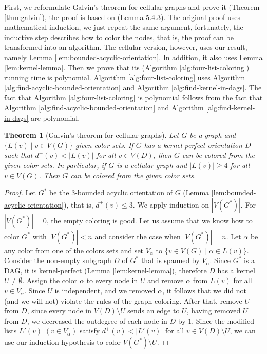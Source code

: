 \documentclass[letterpaper, 10 pt, conference]{ieeeconf}  %
\newtheorem{thm}{Theorem}
\begin{document}
First, we reformulate Galvin's theorem for cellular graphs and prove it (Theorem \ref{thm:galvin}), the proof is based on \cite{citeulike:395714} (Lemma 5.4.3). The original proof uses mathematical induction, we just repeat the same argument, fortunately, the inductive step describes how to color the nodes, that is, the proof can be transformed into an algorithm. The cellular version, however, uses our result, namely Lemma \ref{lem:bounded-acyclic-orientation}. In addition, it also uses Lemma \ref{lem:kernel-lemma}. Then we prove that its (Algorithm \ref{alg:four-list-coloring}) running time is polynomial. Algorithm \ref{alg:four-list-coloring} uses Algorithm \ref{alg:find-acyclic-bounded-orientation} and Algorithm \ref{alg:find-kernel-in-dags}. The fact that Algorithm \ref{alg:four-list-coloring} is polynomial follows from the fact that Algorithm \ref{alg:find-acyclic-bounded-orientation} and Algorithm \ref{alg:find-kernel-in-dags} are polynomial.
\begin{thm}[Galvin's theorem for cellular graphs] Let $G$ be a graph and $\lbrace L(v) \mid v \in V(G) \rbrace$ given color sets. If $G$ has a kernel-perfect orientation $D$ such that $d^+(v) < |L(v)|$ for all $v \in V(D)$, then $G$ can be colored from the given color sets.
In particular, if $G$ is a cellular graph and $|L(v)| \geqslant 4$ for all $v \in V(G)$. Then $G$ can be colored from the given color sets.
\end{thm}
\begin{proof}
Let $G^*$ be the $3$-bounded acyclic orientation of $G$ (Lemma \ref{lem:bounded-acyclic-orientation}), that is, $d^+(v) \leqslant 3$. We apply induction on $|V(G^*)|$. For $|V(G^*)|=0$, the empty coloring is good. Let us assume that we know how to color $G^*$ with $|V(G^*)| < n$ and consider the case when $|V(G^*)|=n$. Let $\alpha$ be any color from one of the colors sets and set $V_\alpha$ to $\lbrace v \in V(G) \mid \alpha \in L(v) \rbrace$. Consider the non-empty subgraph $D$ of $G^*$ that is spanned by $V_\alpha$. Since $G^*$ is a DAG, it is kernel-perfect (Lemma \ref{lem:kernel-lemma}), therefore $D$ has a kernel $U \neq \emptyset$. Assign the color $\alpha$ to every node in $U$ and remove $\alpha$ from $L(v)$ for all $v \in V_\alpha$. Since $U$ is independent, and we removed $\alpha$, it follows that we did not (and we will not) violate the rules of the graph coloring. After that, remove $U$ from $D$, since every node in $V(D) \setminus U$ sends an edge to $U$, having removed $U$ from $D$, we decreased the outdegree of each node in $D$ by $1$. Since the modified lists $L'(v)$ $(v \in V_\alpha)$ satisfy $d^+(v) < |L'(v)|$ for all $v \in V(D) \setminus U$, we can use our induction hypothesis to color $V(G^*) \setminus U$.
\end{proof}
\end{document}
